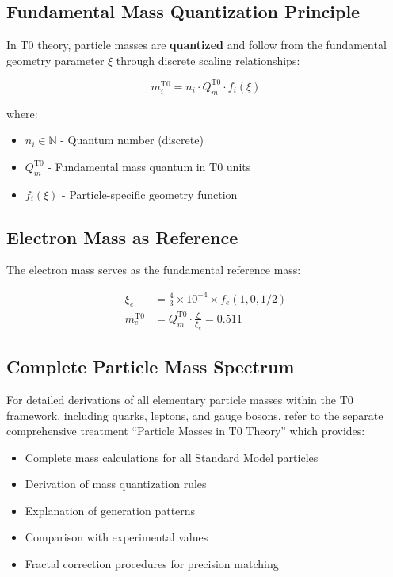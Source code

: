 	\subsection{Fundamental Mass Quantization Principle}
	
	In T0 theory, particle masses are \textbf{quantized} and follow from the fundamental geometry parameter $\xi$ through discrete scaling relationships:
	
	\begin{equation}
		m_i^{\mathrm{T0}} = n_i \cdot Q_m^{\mathrm{T0}} \cdot f_i(\xi)
	\end{equation}
	
	where:
	\begin{itemize}
		\item $n_i \in \mathbb{N}$ - Quantum number (discrete)
		\item $Q_m^{\mathrm{T0}}$ - Fundamental mass quantum in T0 units
		\item $f_i(\xi)$ - Particle-specific geometry function
	\end{itemize}
	
	\subsection{Electron Mass as Reference}
	
	The electron mass serves as the fundamental reference mass:
	
	\begin{align}
		\xi_e &= \frac{4}{3} \times 10^{-4} \times f_e(1,0,1/2) \\
		m_e^{\mathrm{T0}} &= Q_m^{\mathrm{T0}} \cdot \frac{\xi}{\xi_e} = 0.511
	\end{align}
	
	\subsection{Complete Particle Mass Spectrum}
	
	For detailed derivations of all elementary particle masses within the T0 framework, including quarks, leptons, and gauge bosons, refer to the separate comprehensive treatment ``Particle Masses in T0 Theory'' which provides:
	
	\begin{itemize}
		\item Complete mass calculations for all Standard Model particles
		\item Derivation of mass quantization rules
		\item Explanation of generation patterns
		\item Comparison with experimental values
		\item Fractal correction procedures for precision matching
	\end{itemize}
	
